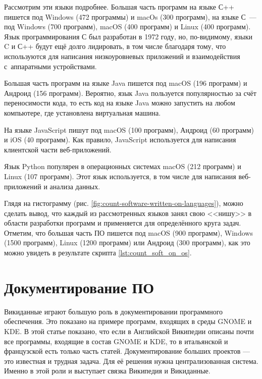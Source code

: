 Рассмотрим эти языки подробнее. 
Большая часть программ на языке С++ пишется под Windows (472 программы) и macOs (300 программ), 
на языке С~--- под Windows (700 программ), macOS (400 программ) и Linux (400 программ). 
Язык программирования С был разработан в 1972 году, 
но, по-видимому, языки C и С++ будут ещё долго лидировать, 
в том числе благодаря тому, что используются для написания низкоуровневых приложений 
и взаимодействия с~аппаратными устройствами\autocite{FutureProgrLang2016}.

Большая часть программ на языке Java пишется под macOS (196 программ) и Андроид (156 программ). 
Вероятно, язык Java пользуется популярностью 
за счёт переносимости кода, 
то есть код на языке Java можно запустить на любом компьютере, 
где установлена виртуальная машина. 

На языке JavaScript пишут под macOS (100 программ), 
Андроид (60 программ) и iOS (40 программ). Как правило, 
JavaScript используется для написания клиентской части веб-приложений.

Язык Python популярен в операционных системах macOS (212 программ) и Linux (107 программ). 
Этот язык используется, в том числе для написания веб-приложений и анализа данных.

Глядя на гистограмму (рис. \ref{fig:count-software-written-on-languages}), можно сделать вывод, что каждый из рассмотренных языков занял свою <<нишу>> в области разработки программ и применяется для определённого круга задач. Отметим, что большая часть ПО пишется под macOS (900 программ), Windows (1500 программ), Linux (1200 программ) или Андроид (300 программ), как это можно увидеть в результате скрипта \ref{lst:count_soft_on_os}.

\section{Документирование ПО}
Викиданные играют большую роль в документировании программного обеспечения. Это показано на примере программ, входящих в среды GNOME и KDE\autocite{Samuel2020DocumentingWiki}. В этой статье показано, что если в Английской Википедии описаны почти все программы, входящие в состав GNOME и KDE, то в итальянской и французской есть только часть статей. Документирование больших проектов --- это известная и трудная задача. Для её решения нужна централизованная система. Именно в этой роли и выступает связка Википедия и Викиданные\autocite{Samuel2020DocumentingWiki}.

